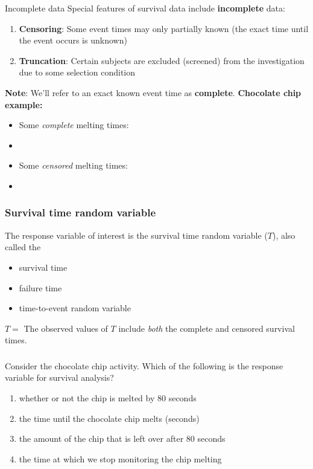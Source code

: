 \begin{frame}{Incomplete data}
Special features of survival data include \textbf{incomplete} data:
\begin{enumerate}
\item \textbf{Censoring}: Some event times may only partially known (the exact time until the event occurs is unknown)
\item \textbf{Truncation}: Certain subjects are excluded (screened) from the investigation due to some selection condition
\end{enumerate}
\vskip10pt
\textbf{Note}: We'll refer to an exact known event time as \textbf{complete}.
\vskip10pt
\textbf{Chocolate chip example:}
\begin{itemize}
\item Some \emph{complete} melting times: %
\item[]
\item Some \emph{censored} melting times: %
\item[]
\end{itemize}
\end{frame}

\begin{frame}
\frametitle{Survival time random variable}
The response variable of interest is the survival time random variable ($T$), also called the
\begin{itemize}
\item survival time
\item failure time
\item time-to-event random variable
\end{itemize}
\vskip20pt
$T = $
\vskip20pt
The observed values of $T$ include \emph{both} the complete and censored survival times.
\end{frame}

\begin{frame}
\frametitle{\grp}
\begin{clicker}{Consider the chocolate chip activity.  Which of the following is the response variable for survival analysis?}
\begin{enumerate}
\item whether or not the chip is melted by 80 seconds
\item the time until the chocolate chip melts (seconds) %
\item the amount of the chip that is left over after 80 seconds
\item the time at which we stop monitoring the chip melting
\end{enumerate}
\end{clicker}
\end{frame}

